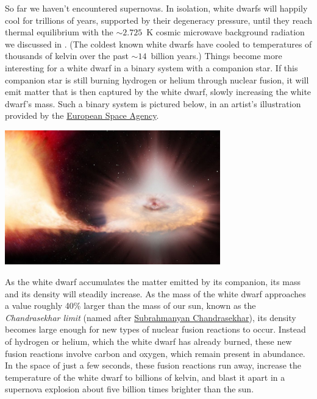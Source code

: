 So far we haven't encountered supernovas.
In isolation, white dwarfs will happily cool for trillions of years, supported by their degeneracy pressure, until they reach thermal equilibrium with the $\sim$$2.725$~K cosmic microwave background radiation we discussed in .
(The coldest known white dwarfs have cooled to temperatures of thousands of kelvin over the past $\sim$$14$~billion years.)
Things become more interesting for a white dwarf in a binary system with a companion star.
If this companion star is still burning hydrogen or helium through nuclear fusion, it will emit matter that is then captured by the white dwarf, slowly increasing the white dwarf's mass.
Such a binary system is pictured below, in an artist's illustration provided by the \href{https://www.esa.int/ESA_Multimedia/Images/2014/09/Artist_s_impression_of_Type_Ia_supernova}{European Space Agency}.

\begin{center}\includegraphics[width=0.7\textwidth]{figs/unit08_nova.pdf}\end{center} %

As the white dwarf accumulates the matter emitted by its companion, its mass and its density will steadily increase.
As the mass of the white dwarf approaches a value roughly 40\% larger than the mass of our sun, known as the \textit{Chandrasekhar limit} (named after \href{https://en.wikipedia.org/wiki/Subrahmanyan_Chandrasekhar}{Subrahmanyan Chandrasekhar}), its density becomes large enough for new types of nuclear fusion reactions to occur.
Instead of hydrogen or helium, which the white dwarf has already burned, these new fusion reactions involve carbon and oxygen, which remain present in abundance.
In the space of just a few seconds, these fusion reactions run away, increase the temperature of the white dwarf to billions of kelvin, and blast it apart in a supernova explosion about five billion times brighter than the sun.

